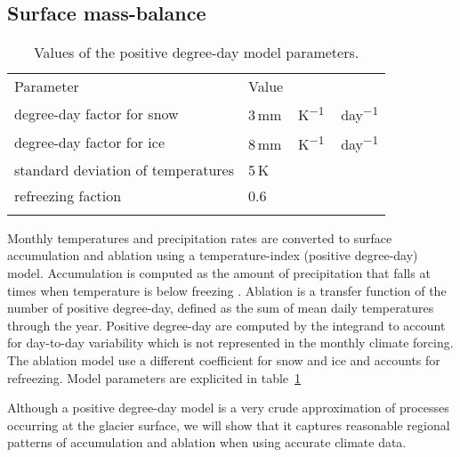 \subsection{Surface mass-balance}

\begin{table}[t]
	\caption{Values of the positive degree-day model parameters.}
	\label{tab:pdd}
	\vskip4mm
	\centering
	\begin{tabular}{ll}
		\tophline
		Parameter& Value\\
		\middlehline
		degree-day factor for snow & 3\,\unit{mm\,K^{-1}\,day^{-1}}\\
		degree-day factor for ice & 8\,\unit{mm\,K^{-1}\,day^{-1}}\\
		standard deviation of temperatures & 5\,K\\
		refreezing faction & 0.6 \\
		\bottomhline
	\end{tabular}
\end{table}

Monthly temperatures and precipitation rates are converted to surface accumulation and ablation using a temperature-index (positive degree-day) model\needref. Accumulation is computed as the amount of precipitation that falls at times when temperature is below freezing . Ablation is a transfer function of the number of positive degree-day, defined as the sum of mean daily temperatures through the year. Positive degree-day are computed by the \citet{calov-greve-2011} integrand to account for day-to-day variability which is not represented in the monthly climate forcing. The ablation model use a different coefficient for snow and ice and accounts for refreezing. Model parameters are explicited in table~\ref{tab:pdd}

Although a positive degree-day model is a very crude approximation of processes occurring at the glacier surface, we will show that it captures reasonable regional patterns of accumulation and ablation when using accurate climate data.



